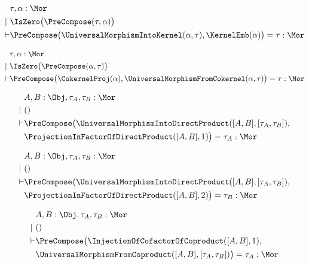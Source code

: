 \begin{sequent}
\begin{align*}
  &\tau, \alpha:\Mor\\
  |~ &\IsZero\big( \PreCompose( \tau, \alpha ) \big)\\
  \vdash &\PreCompose\big(\UniversalMorphismIntoKernel( \alpha , \tau ), \KernelEmb( \alpha ) \big) = \tau:\Mor
\end{align*}
\end{sequent}

\begin{sequent}
\begin{align*}
  &\tau, \alpha:\Mor\\
  |~  &\IsZero\big(\PreCompose(\alpha, \tau)\big)\\
  \vdash &\PreCompose\big(\CokernelProj( \alpha ), \UniversalMorphismFromCokernel( \alpha, \tau )\big) = \tau:\Mor
\end{align*}
\end{sequent}

\begin{sequent}
\begin{align*}
  &A, B:\Obj, \tau_A, \tau_B:\Mor\\
  | ~&() \\
  \vdash &\PreCompose\big(\UniversalMorphismIntoDirectProduct( [A,B], [\tau_A, \tau_B] ), \\
  &\ProjectionInFactorOfDirectProduct( [A,B], 1 ) \big) = \tau_A:\Mor
\end{align*}
\end{sequent}

\begin{sequent}
\begin{align*}
&A, B:\Obj, \tau_A, \tau_B:\Mor\\
  | ~&() \\
  \vdash &\PreCompose\big(\UniversalMorphismIntoDirectProduct( [A,B], [\tau_A, \tau_B] ), \\
  &\ProjectionInFactorOfDirectProduct( [A,B], 2 ) \big) = \tau_B:\Mor
\end{align*}
\end{sequent}

\begin{sequent}
\begin{align*}
  &A, B:\Obj, \tau_A, \tau_B:\Mor \\
  |~ &()\\
  \vdash &\PreCompose\big(\InjectionOfCofactorOfCoproduct( [A, B], 1 ),\\
  &\UniversalMorphismFromCoproduct( [A,B], [\tau_A, \tau_B] ) \big) = \tau_A:\Mor
\end{align*}
\end{sequent}

